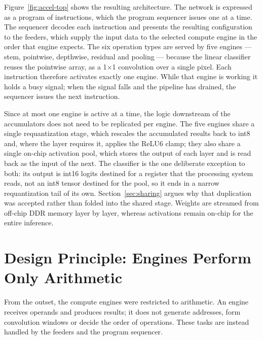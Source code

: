 Figure~\ref{fig:accel-top} shows the resulting architecture. The network is
expressed as a program of \thInstructions{} instructions, which the program
sequencer issues one at a time. The sequencer decodes each instruction and
presents the resulting configuration to the feeders, which supply the input
data to the selected compute engine in the order that engine expects. The six
operation types are served by five engines --- stem, pointwise, depthwise,
residual and pooling --- because the linear classifier reuses the pointwise
array, as a 1$\times$1 convolution over a single pixel. Each instruction
therefore activates exactly one engine. While that engine is working it holds a
busy signal; when the signal falls and the pipeline has drained, the sequencer
issues the next instruction.

Since at most one engine is active at a time, the logic downstream of the
accumulators does not need to be replicated per engine. The five engines share
a single requantization stage, which rescales the accumulated results back to
int8 and, where the layer requires it, applies the ReLU6 clamp; they also share
a single on-chip activation pool, which stores the output of each layer and is
read back as the input of the next. The classifier is the one deliberate
exception to both: its output is \thClasses{} int16 logits destined for a
register that the processing system reads, not an int8 tensor destined for the
pool, so it ends in a narrow requantization tail of its own.
Section~\ref{sec:sharing} argues why that duplication was accepted rather than
folded into the shared stage. Weights are streamed from off-chip DDR memory
layer by layer, whereas activations remain on-chip for the entire inference.

\section{Design Principle: Engines Perform Only Arithmetic}
\label{sec:engines-philosophy}

From the outset, the compute engines were restricted to arithmetic. An engine
receives operands and produces results; it does not generate addresses, form
convolution windows or decide the order of operations. These tasks are instead
handled by the feeders and the program sequencer.

